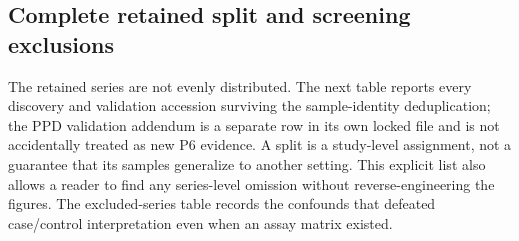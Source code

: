 \documentclass[11pt,a4paper]{article}
\begin{document}
\subsection{Complete retained split and screening exclusions}
The retained series are not evenly distributed. The next table reports every discovery and validation accession surviving the sample-identity deduplication; the PPD validation addendum is a separate row in its own locked file and is not accidentally treated as new P6 evidence. A split is a study-level assignment, not a guarantee that its samples generalize to another setting. This explicit list also allows a reader to find any series-level omission without reverse-engineering the figures. The excluded-series table records the confounds that defeated case/control interpretation even when an assay matrix existed.


\end{document}
